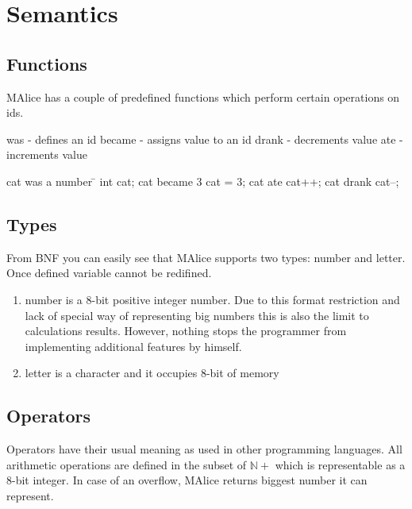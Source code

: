 \documentclass[a4wide, 11pt]{article}
\begin{document}
\section{Semantics}

\subsection{Functions}

MAlice has a couple of predefined functions which perform certain operations on ids.
\begin{tabbing}
\+ was - defines an id
\+ became - assigns value to an id
\+ drank - decrements value
\+ ate - increments value

cat was a number \=\/\/ int cat;
cat became 3 \> cat = 3;
cat ate \> cat++;
cat drank \> cat--;
\end{tabbing}

\subsection{Types}

From BNF you can easily see that MAlice supports two types: number and letter. Once defined variable cannot be redifined.

\begin{enumerate}
     \item
     number is a 8-bit positive integer number. Due to this format restriction and lack of special way of representing big numbers this is also the limit to calculations results. However, nothing stops the programmer from implementing additional features by himself.  

     \item
     letter is a character and it occupies 8-bit of memory

\end{enumerate}

\subsection{Operators}

Operators have their usual meaning as used in other programming languages. All arithmetic operations are defined in the subset of $\mathbb{N+}$ which is representable as a 8-bit integer. In case of an overflow, MAlice returns biggest number it can represent.
\end{document}
